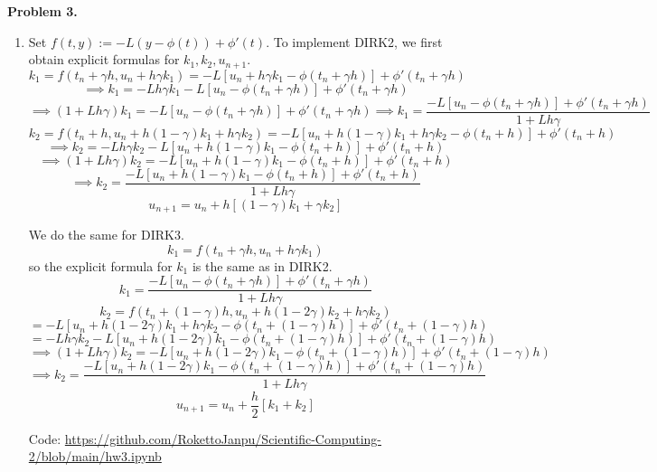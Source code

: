 \documentclass{article}
\def\tbf#1{\textbf{#1}}
\newcommand{\sbr}[1]{\left[#1\right]}
\newcommand{\imp}{\implies}
\begin{document}
\tbf{Problem 3.}

\begin{enumerate}
	
\item Set $f(t,y):=-L(y-\phi(t))+\phi'(t)$. To implement DIRK2, we first obtain explicit formulas for $k_1,k_2,u_{n+1}$.
$$k_1 = f(t_n+\gamma h,u_n+h\gamma k_1)
= -L\sbr{u_n+h\gamma k_1-\phi(t_n+\gamma h)}+\phi'(t_n+\gamma h)$$
$$\imp k_1 = -Lh\gamma k_1-L\sbr{u_n-\phi(t_n+\gamma h)}+\phi'(t_n+\gamma h)$$
$$\imp (1+Lh\gamma)k_1 = -L\sbr{u_n-\phi(t_n+\gamma h)}+\phi'(t_n+\gamma h)
\imp k_1 = \frac{-L\sbr{u_n-\phi(t_n+\gamma h)}+\phi'(t_n+\gamma h)}{1+Lh\gamma}$$
$$k_2 = f(t_n+h,u_n+h(1-\gamma)k_1+h\gamma k_2) = -L\sbr{u_n+h(1-\gamma)k_1+h\gamma k_2-\phi(t_n+h)}+\phi'(t_n+h)$$
$$\imp k_2 = -Lh\gamma k_2-L\sbr{u_n+h(1-\gamma)k_1-\phi(t_n+h)}+\phi'(t_n+h)$$
$$\imp (1+Lh\gamma)k_2 = -L\sbr{u_n+h(1-\gamma)k_1-\phi(t_n+h)}+\phi'(t_n+h)$$
$$\imp k_2 = \frac{-L\sbr{u_n+h(1-\gamma)k_1-\phi(t_n+h)}+\phi'(t_n+h)}{1+Lh\gamma}$$
$$u_{n+1} = u_n+h\sbr{(1-\gamma)k_1+\gamma k_2}$$

We do the same for DIRK3.
$$k_1 = f(t_n+\gamma h,u_n+h\gamma k_1)$$
so the explicit formula for $k_1$ is the same as in DIRK2.
$$k_1 = \frac{-L\sbr{u_n-\phi(t_n+\gamma h)}+\phi'(t_n+\gamma h)}{1+Lh\gamma}$$
$$k_2 = f(t_n+(1-\gamma)h,u_n+h(1-2\gamma)k_2+h\gamma k_2)$$
$$= -L\sbr{u_n+h(1-2\gamma)k_1+h\gamma k_2-\phi(t_n+(1-\gamma)h)}+\phi'(t_n+(1-\gamma)h)$$
$$= -Lh\gamma k_2-L\sbr{u_n+h(1-2\gamma)k_1-\phi(t_n+(1-\gamma)h)}+\phi'(t_n+(1-\gamma)h)$$
$$\imp (1+Lh\gamma)k_2 = -L\sbr{u_n+h(1-2\gamma)k_1-\phi(t_n+(1-\gamma)h)}+\phi'(t_n+(1-\gamma)h)$$
$$\imp k_2 = \frac{-L\sbr{u_n+h(1-2\gamma)k_1-\phi(t_n+(1-\gamma)h)}+\phi'(t_n+(1-\gamma)h)}{1+Lh\gamma}$$
$$u_{n+1} = u_n+\frac h2[k_1+k_2]$$

Code: \url{https://github.com/RokettoJanpu/Scientific-Computing-2/blob/main/hw3.ipynb}


\end{enumerate}
\end{document}
